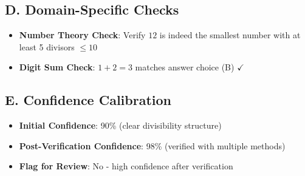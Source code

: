 \documentclass[]{article}
\begin{document}
\begin{verificationbox}
\subsection*{D. Domain-Specific Checks}
\begin{itemize}[leftmargin=*]
    \item \textbf{Number Theory Check}: Verify $12$ is indeed the smallest number with at least 5 divisors $\leq 10$
    \item \textbf{Digit Sum Check}: $1 + 2 = 3$ matches answer choice (B) $\checkmark$
\end{itemize}

\subsection*{E. Confidence Calibration}
\begin{itemize}[leftmargin=*]
    \item \textbf{Initial Confidence}: 90\% (clear divisibility structure)
    \item \textbf{Post-Verification Confidence}: 98\% (verified with multiple methods)
    \item \textbf{Flag for Review}: No - high confidence after verification
\end{itemize}
\end{verificationbox}
\end{document}
